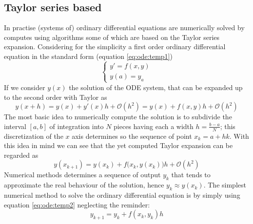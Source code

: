 \subsection{Taylor series based}
	In practise (systems of) ordinary  differential equations are numerically solved by computes using algorithms some of which are based on the Taylor series expansion. Considering for the simplicity a first order ordinary differential equation in the standard form (equation \ref{eq:ode:temp1})
	\[ \begin{cases}
		y' = f(x,y) \\ y(a) = y_a
	\end{cases} \]
	If we consider $y(x)$ the solution of the ODE system, that can be expanded up to the second order with Taylor as
	\[ y(x+h) = y(x) + y'(x) h + \mathcal O (h^2) = y(x) + f(x,y) h + \mathcal O (h^2) \]
	The most basic idea to numerically compute the solution is to subdivide the interval $[a,b]$ of integration into $N$ pieces having each a width $h = \frac{b-a}{N}$; this discretization of the $x$ axis determines so the sequence of point $x_k = a + h k$. With this idea in mind we can see that the yet computed Taylor expansion can be regarded as
	\begin{equation} \label{eq:ode:temp2}
		y(x_{k+1}) = y(x_k) + f\big(x_k, y(x_k)\big) h + \mathcal O(h^2)
	\end{equation}
	Numerical methods determines a sequence of output $y_k$ that tends to approximate the real behaviour of the solution, hence $y_k \approx y(x_k)$. The simplest numerical method to solve the ordinary differential equation is by simply using  equation \ref{eq:ode:temp2} neglecting the reminder:
	\begin{equation} \label{eq:ode:expliciteuler}
		y_{k+1} = y_k + f(x_k,y_k) h 
	\end{equation}
	
